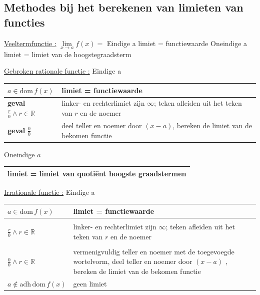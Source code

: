 \documentclass[a5paper]{article}
\begin{document}
\subsection{Methodes bij het berekenen van limieten van functies}
\par\vspace{0.3cm}
% 
%
\underline{Veeltermfunctie :} $\mathop {\lim }\limits_{x \to a} f\left( x \right) = $ Eindige a	limiet = functiewaarde \newline
Oneindige a	limiet = limiet van de hoogstegraadsterm \newline
\par\vspace{0.3cm}
% 
%
\underline{Gebroken rationale functie :} \newline
Eindige a \newline
\begin{tabularx}{\textwidth}{|>{\centering\arraybackslash}m{3.5cm}|X|}
\hline
\( a \in \mathrm{dom} \, f(x) \) & limiet = functiewaarde \\
\hline
\textbf{geval} \( \frac{r}{0} \land r \in \mathbb{R} \) & linker- en rechterlimiet zijn \( \infty \); teken afleiden uit het teken van \( r \) en de noemer \\
\hline
\textbf{geval} \( \frac{0}{0} \) & deel teller en noemer door \( (x - a) \), bereken de limiet van de bekomen functie \\
\hline
\end{tabularx}
Oneindige \( a \)\newline
\begin{tabularx}{\textwidth}{|X|}
\hline
limiet = limiet van quotiënt hoogste graadstermen \\
\hline
\end{tabularx}
\par\vspace{0.3cm}
% 
%
\underline{Irrationale functie :} \newline
Eindige a \newline
\begin{tabularx}{\textwidth}{|>{\centering\arraybackslash}m{4.5cm}|X|}
\hline
\( a \in \mathrm{dom} \, f(x) \) & limiet = functiewaarde \\
\hline
\begin{tabular}[c]{@{}c@{}}%
\( a \in \mathrm{adh} \, \mathrm{dom} \, f(x) \) \\
\( \displaystyle \frac{r}{0} \land r \in \mathbb{R} \)
\end{tabular} 
& linker- en rechterlimiet zijn \( \infty \); teken afleiden uit het teken van \( r \) en de noemer \\
\hline
\begin{tabular}[c]{@{}c@{}}%
\( a \in \mathrm{adh} \, \mathrm{dom} \, f(x) \) \\
\( \displaystyle \frac{0}{0} \land r \in \mathbb{R} \)
\end{tabular} 
& vermenigvuldig teller en noemer met de toegevoegde wortelvorm, deel teller en noemer door $\left( {x - a} \right)$ , bereken de limiet van de bekomen functie \\
\hline
\( a \notin \mathrm{adh} \, \mathrm{dom} \, f(x) \)
& geen limiet \\
\hline
\end{tabularx}
\end{document}
